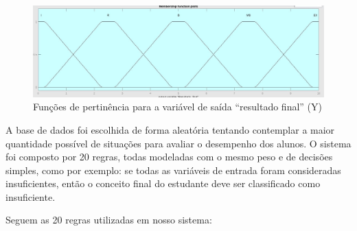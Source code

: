 \documentclass{article}
\begin{document}
\newpage

\begin{figure}[h!]
\centering
\includegraphics[scale=.2]{Y.png}
\caption{Funções de pertinência para a variável de saída
``resultado final'' (Y)}
\label{fig:notas_de_provas_escritas}
\end{figure}

A base de dados foi escolhida de forma aleatória tentando
contemplar a maior quantidade possível de situações para avaliar
o desempenho dos alunos. O sistema foi composto por 20 regras,
todas modeladas com o mesmo peso e de decisões simples, como por
exemplo: se todas as variáveis de entrada foram consideradas
insuficientes, então o conceito final do estudante deve ser
classificado como insuficiente.

Seguem as 20 regras utilizadas em nosso sistema:
\end{document}
